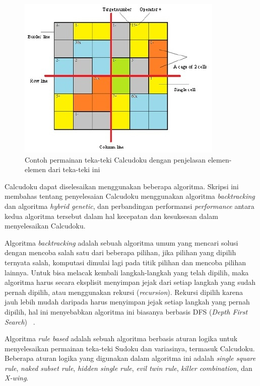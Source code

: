 \begin{figure}
\centering
\captionsetup{justification=centering}
\includegraphics[scale=1]{Gambar/HybridGenetic1}
\caption[Contoh permainan teka-teki Calcudoku dengan penjelasan tentang elemen-elemen dari teka-teki ini ~\cite{johanna:12:hybrid}]{Contoh permainan teka-teki Calcudoku dengan penjelasan elemen-elemen dari teka-teki ini ~\cite{johanna:12:hybrid}}
\label{fig:hybrid1}
\end{figure}

Calcudoku dapat diselesaikan menggunakan beberapa algoritma. Skripsi ini membahas tentang penyelesaian Calcudoku menggunakan algoritma \textit{backtracking} dan algoritma \textit{hybrid genetic}, dan perbandingan performansi \textit{performance} antara kedua algoritma tersebut dalam hal kecepatan dan kesuksesan dalam menyelesaikan Calcudoku.

Algoritma \textit{backtracking} adalah sebuah algoritma umum yang mencari solusi dengan mencoba salah satu dari beberapa pilihan, jika pilihan yang dipilih ternyata salah, komputasi dimulai lagi pada titik pilihan dan mencoba pilihan lainnya. Untuk bisa melacak kembali langkah-langkah yang telah dipilih, maka algoritma harus secara eksplisit menyimpan jejak dari setiap langkah yang sudah pernah dipilih, atau menggunakan rekursi (\textit{recursion}). Rekursi dipilih karena jauh lebih mudah daripada harus menyimpan jejak setiap langkah yang pernah dipilih, hal ini menyebabkan algoritma ini biasanya berbasis DFS (\textit{Depth First Search}) ~\cite{fahda:16:backtracking}.

Algoritma \textit{rule based} adalah sebuah algoritma berbasis aturan logika untuk menyelesaikan permainan teka-teki Sudoku dan variasinya, termasuk Calcudoku. Beberapa aturan logika yang digunakan dalam algoritma ini adalah \textit{single square rule}, \textit{naked subset rule}, \textit{hidden single rule}, \textit{evil twin rule}, \textit{killer combination}, dan \textit{X-wing}.

